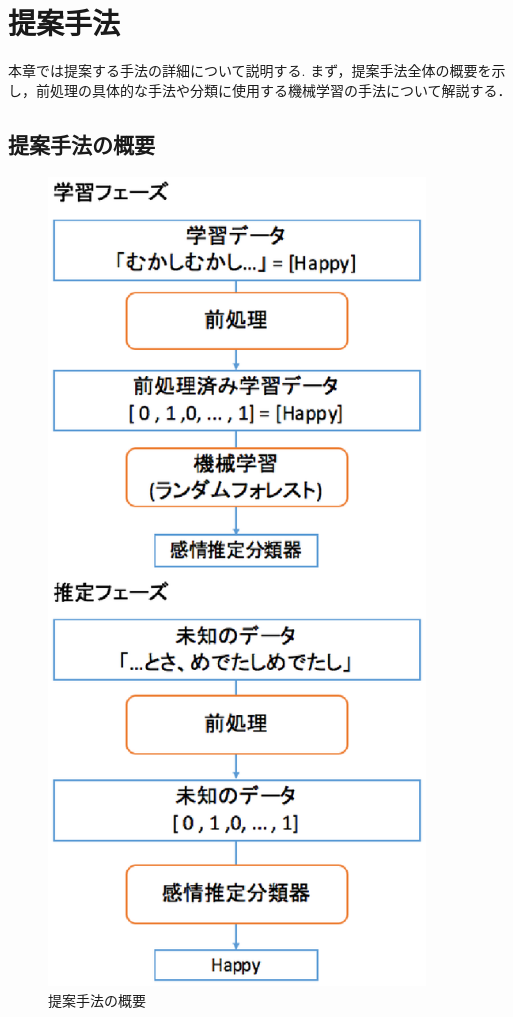 \chapter{提案手法}
本章では提案する手法の詳細について説明する.
まず，提案手法全体の概要を示し，前処理の具体的な手法や分類に使用する機械学習の手法について解説する．

\section{提案手法の概要}
\begin{figure}[ht]
  \begin{center}
    \includegraphics[clip,width=10.0cm]{fig/method-2.eps}
    \caption{提案手法の概要}
    \label{fig:method}
  \end{center}
\end{figure}

